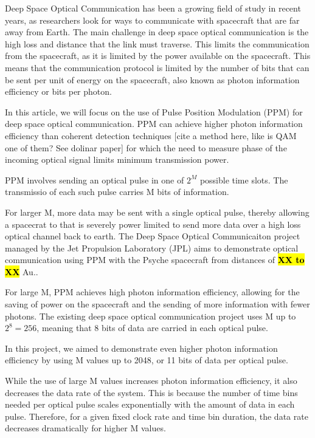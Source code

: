 \documentclass{optica-article}
\begin{document}
Deep Space Optical Communication has been a growing field of study in recent years, as researchers look for ways to communicate with spacecraft that are far away from Earth. The main challenge in deep space optical communication is the high loss and distance that the link must traverse. This limits the communication from the spacecraft, as it is limited by the power available on the spacecraft. This means that the communication protocol is limited by the number of bits that can be sent per unit of energy on the spacecraft, also known as photon information efficiency or bits per photon.

In this article, we will focus on the use of Pulse Position Modulation (PPM) for deep space optical communication. PPM can achieve higher photon information efficiency than coherent detection techniques {[}cite a method here, like is QAM one of them? See dolinar paper{]} for which the need to measure phase of the incoming optical signal limits minimum transmission power.

PPM involves sending an optical pulse in one of \(2^M\) possible time slots. The transmissio of each such pulse carries M bits of information.

For larger M, more data may be sent with a single optical pulse, thereby allowing a spacecrat to that is severely power limited to send more data over a high loss optical channel back to earth. The Deep Space Optical Communicaiton project managed by the Jet Propulsion Laboratory (JPL) aims to demonstrate optical communication using PPM with the Psyche spacecraft from distances of \textbf{\hl{XX to XX}} Au..

For large M, PPM achieves high photon information efficiency, allowing for the saving of power on the spacecraft and the sending of more information with fewer photons. The existing deep space optical communication project uses M up to \(2^8 = 256\), meaning that 8 bits of data are carried in each optical pulse.

In this project, we aimed to demonstrate even higher photon information efficiency by using M values up to 2048, or 11 bits of data per optical pulse.

While the use of large M values increases photon information efficiency, it also decreases the data rate of the system. This is because the number of time bins needed per optical pulse scales exponentially with the amount of data in each pulse. Therefore, for a given fixed clock rate and time bin duration, the data rate decreases dramatically for higher M values.
\end{document}

